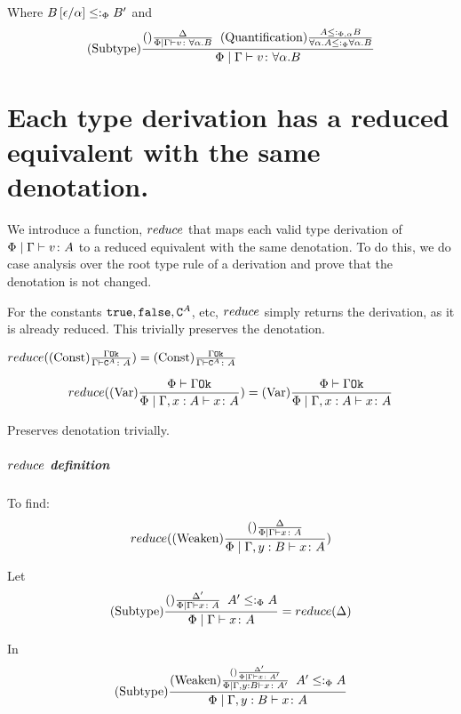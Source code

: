 \documentclass{report}
\begin{document}
    Where $B\left[\epsilon / \alpha\right]\leq:_\Phi B'$
    and
    \begin{equation}
        (\text{Subtype}) \frac{
            (\text{}) \frac{\Delta}{\Phi\mid\Gamma \vdash v \colon \forall \alpha. B}\;\; (\text{Quantification}) \frac{A\leq:_{\Phi, \alpha} B}{\forall \alpha. A\leq:_\Phi\forall \alpha. B}
        }{\Phi\mid\Gamma \vdash v \colon \forall \alpha. B}
    \end{equation}


    \section{Each type derivation has a reduced equivalent with the same denotation.}
    We introduce a function, $reduce$ that maps each valid type derivation of $\Phi\mid\Gamma \vdash v \colon A$ to a reduced equivalent with the same denotation. To do this, we do case analysis over the root type rule of a derivation and prove that the denotation is not changed.

            For the constants $\texttt{true}, \texttt{false}, \texttt{C}^{A}$, etc, $reduce$ simply returns the derivation, as it is already reduced. This trivially preserves the denotation.

            $reduce((\text{Const}) \frac{\Gamma \texttt{Ok}}{\Gamma \vdash \texttt{C}^{A} \colon A}) = (\text{Const}) \frac{\Gamma \texttt{Ok}}{\Gamma \vdash \texttt{C}^{A} \colon A}$

            \begin{equation}
                reduce((\text{Var}) \frac{\Phi\vdash \Gamma \texttt{Ok}}{\Phi\mid\Gamma, x: A \vdash x \colon A}) =  (\text{Var}) \frac{\Phi\vdash \Gamma \texttt{Ok}}{\Phi\mid\Gamma, x: A \vdash x \colon A}
            \end{equation}

            Preserves denotation trivially.

            \subparagraph{$reduce$ definition}
            To find:
            \begin{equation}
                reduce((\text{Weaken}) \frac{(\text{}) \frac{\Delta}{\Phi\mid\Gamma \vdash x \colon A}}{\Phi\mid\Gamma, y: B \vdash x \colon A})
            \end{equation}

            Let 
            \begin{equation}\label{WeakenDeltaReduction}
                (\text{Subtype}) \frac{(\text{}) \frac{\Delta'}{\Phi\mid\Gamma \vdash x \colon A}\;\; A'\leq:_\Phi A}{\Phi\mid\Gamma \vdash x \colon A} = reduce(\Delta)
            \end{equation}

            In 
            \begin{equation}
                (\text{Subtype}) \frac{
                (\text{Weaken}) \frac{
                    (\text{}) \frac{\Delta'}{\Phi\mid\Gamma \vdash x \colon A'}
                }{
                    \Phi\mid\Gamma, y: B \vdash x \colon A'
                }
                \;\;
                A' \leq:_\Phi A
                }{\Phi\mid\Gamma, y: B \vdash x \colon A}
            \end{equation}
\end{document}
